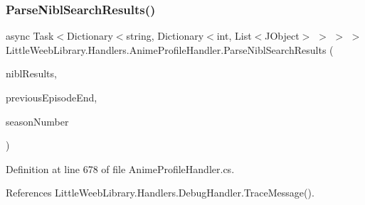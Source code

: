 \subsubsection{\texorpdfstring{Parse\+Nibl\+Search\+Results()}{ParseNiblSearchResults()}}
{\footnotesize\ttfamily async Task$<$Dictionary$<$string, Dictionary$<$int, List$<$J\+Object$>$ $>$ $>$ $>$ Little\+Weeb\+Library.\+Handlers.\+Anime\+Profile\+Handler.\+Parse\+Nibl\+Search\+Results (\begin{DoxyParamCaption}\item[{J\+Object}]{nibl\+Results,  }\item[{int}]{previous\+Episode\+End,  }\item[{int}]{season\+Number }\end{DoxyParamCaption})\hspace{0.3cm}{\ttfamily [private]}}



Definition at line 678 of file Anime\+Profile\+Handler.\+cs.



References Little\+Weeb\+Library.\+Handlers.\+Debug\+Handler.\+Trace\+Message().


